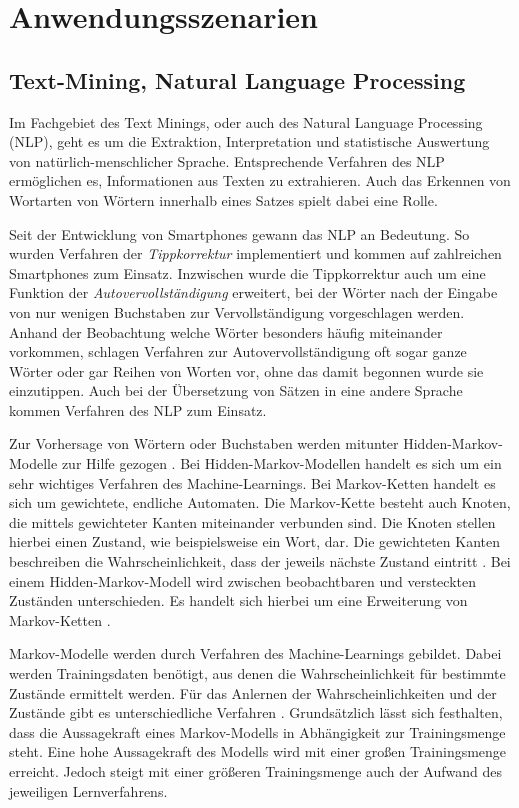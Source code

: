\setcounter{chapter}{1}

\section{Anwendungsszenarien}%
\subsection{Text-Mining, Natural Language Processing}
Im Fachgebiet des Text Minings, oder auch des Natural Language Processing (NLP), geht es um die Extraktion, Interpretation und statistische Auswertung von natürlich-menschlicher Sprache. Entsprechende Verfahren des NLP ermöglichen es, Informationen aus Texten zu extrahieren. Auch das Erkennen von Wortarten von Wörtern innerhalb eines Satzes spielt dabei eine Rolle.

Seit der Entwicklung von Smartphones gewann das NLP an Bedeutung. So wurden Verfahren der \emph{Tippkorrektur} implementiert und kommen auf zahlreichen Smartphones zum Einsatz. Inzwischen wurde die Tippkorrektur auch um eine Funktion der \emph{Autovervollständigung} erweitert, bei der Wörter nach der Eingabe von nur wenigen Buchstaben zur Vervollständigung vorgeschlagen werden. Anhand der Beobachtung welche Wörter besonders häufig miteinander vorkommen, schlagen Verfahren zur Autovervollständigung oft sogar ganze Wörter oder gar Reihen von Worten vor, ohne das damit begonnen wurde sie einzutippen. Auch bei der Übersetzung von Sätzen in eine andere Sprache kommen Verfahren des NLP zum Einsatz.

Zur Vorhersage von Wörtern oder Buchstaben werden mitunter Hidden-Markov-Modelle zur Hilfe gezogen \cite[p.~207]{jurafsky01}. Bei Hidden-Markov-Modellen handelt es sich um ein sehr wichtiges Verfahren des Machine-Learnings. Bei Markov-Ketten handelt es sich um gewichtete, endliche Automaten. Die Markov-Kette besteht auch Knoten, die mittels gewichteter Kanten miteinander verbunden sind. Die Knoten stellen hierbei einen Zustand, wie beispielsweise ein Wort, dar. Die gewichteten Kanten beschreiben die Wahrscheinlichkeit, dass der jeweils nächste Zustand eintritt \cite[p.~208 ff.]{jurafsky01}\cite[p.~318 ff.]{manning01}. Bei einem Hidden-Markov-Modell wird zwischen beobachtbaren und versteckten Zuständen unterschieden. Es handelt sich hierbei um eine Erweiterung von Markov-Ketten \cite[p.~211 ff.]{jurafsky01}. 

Markov-Modelle werden durch Verfahren des Machine-Learnings gebildet. Dabei werden Trainingsdaten benötigt, aus denen die Wahrscheinlichkeit für bestimmte Zustände ermittelt werden. Für das Anlernen der Wahrscheinlichkeiten und der Zustände gibt es unterschiedliche Verfahren \cite[p.~213 ff.]{jurafsky01}\cite[p.~326 ff.]{manning01}. Grundsätzlich lässt sich festhalten, dass die Aussagekraft eines Markov-Modells in Abhängigkeit zur Trainingsmenge steht. Eine hohe Aussagekraft des Modells wird mit einer großen Trainingsmenge erreicht. Jedoch steigt mit einer größeren Trainingsmenge auch der Aufwand des jeweiligen Lernverfahrens.

